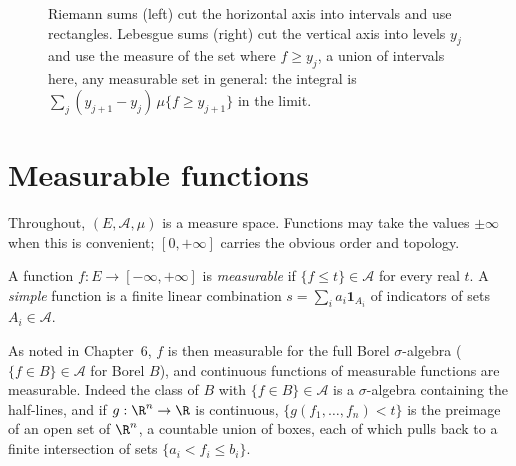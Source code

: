\begin{figure}[ht]
\centering
{}
\caption{Riemann sums (left) cut the horizontal axis into intervals and use rectangles. Lebesgue sums (right) cut the vertical axis into levels $y_j$ and use
the measure of the set where $f\ge y_j$, a union of intervals here, any measurable set in general: the integral is $\sum_j(y_{j+1}-y_j)\,\mu\{f\ge y_{j+1}\}$ in the limit.}
\label{fig:sums}
\end{figure}

\section{Measurable functions}

Throughout, $(E,\mathcal A,\mu)$ is a measure space. Functions may take the values $\pm\infty$ when this is convenient; $[0,+\infty]$ carries the obvious order and
topology.

\begin{definition}
A function $f:E\to[-\infty,+\infty]$ is \emph{measurable} if $\{f\le t\}\in\mathcal A$ for every real $t$. A \emph{simple} function is a finite linear combination $s=\sum_ia_i\mathbf 1_{A_i}$ of
indicators of sets $A_i\in\mathcal A$.
\end{definition}

As noted in Chapter~6, $f$ is then measurable for the full Borel $\sigma$-algebra ($\{f\in B\}\in\mathcal A$ for Borel $B$), and continuous functions of measurable functions are
measurable. Indeed the class of $B$ with $\{f\in B\}\in\mathcal A$ is a $\sigma$-algebra containing the half-lines, and if $g:\R^n\to\R$ is continuous, $\{g(f_1,\dots,f_n)<t\}$ is the
preimage of an open set of $\R^n$, a countable union of boxes, each of which pulls back to a finite intersection of sets $\{a_i<f_i\le b_i\}$.

